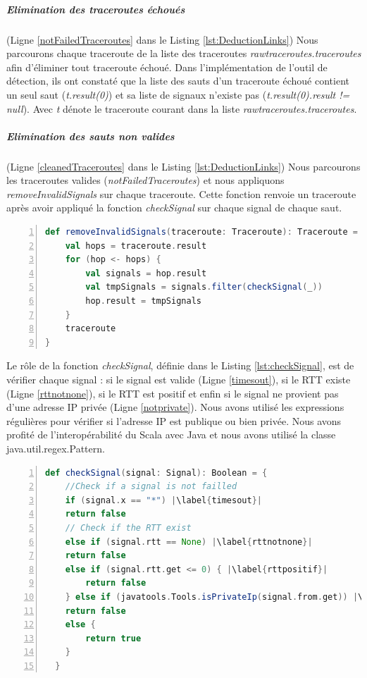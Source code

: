\subparagraph{Elimination des traceroutes échoués} (Ligne \ref{notFailedTraceroutes} dans le Listing \ref{lst:DeductionLinks}) Nous parcourons chaque traceroute de la liste des traceroutes \textit{rawtraceroutes.traceroutes} afin d'éliminer tout traceroute échoué. Dans l'implémentation de l'outil de détection, ils ont constaté que la liste des sauts d'un traceroute échoué contient un seul saut (\textit{t.result(0)}) et sa liste de signaux n'existe pas (\textit{t.result(0).result != null}). Avec \textit{t} dénote le traceroute courant dans la liste \textit{rawtraceroutes.traceroutes}. 


\subparagraph{Elimination des sauts non valides} (Ligne \ref{cleanedTraceroutes} dans le Listing \ref{lst:DeductionLinks}) Nous parcourons les traceroutes valides (\textit{notFailedTraceroutes}) et nous appliquons  \textit{removeInvalidSignals} sur chaque traceroute. Cette fonction renvoie un traceroute après avoir appliqué la fonction \textit{checkSignal} sur chaque signal de chaque saut. 

\begin{lstlisting}[language=scala,firstnumber=1, caption={Définition de la méthode removeInvalidSignals},label={lst:removeInvalidSignals}, basicstyle = \footnotesize,escapechar=|,numbers=left,
stepnumber=1]
  def removeInvalidSignals(traceroute: Traceroute): Traceroute = {
	val hops = traceroute.result
	for (hop <- hops) {
		val signals = hop.result
		val tmpSignals = signals.filter(checkSignal(_))
		hop.result = tmpSignals
	}
	traceroute
}
\end{lstlisting}

Le rôle de la fonction \textit{checkSignal}, définie dans le Listing \ref{lst:checkSignal},  est de vérifier chaque signal : si le signal est valide (Ligne \ref{timesout}), si le RTT existe (Ligne \ref{rttnotnone}), si le RTT est positif \label{rttpositif} et enfin si le signal ne provient pas d'une adresse IP privée (Ligne \ref{notprivate}). Nous avons utilisé les expressions régulières pour vérifier si l'adresse IP est publique ou bien privée. Nous avons profité de l'interopérabilité du Scala avec Java et nous avons  utilisé la classe java.util.regex.Pattern.

\begin{lstlisting}[language=scala,firstnumber=1, caption={Définition de la méthode checkSignal},label={lst:checkSignal}, basicstyle = \footnotesize,escapechar=|,numbers=left,
stepnumber=1]
  def checkSignal(signal: Signal): Boolean = {
	//Check if a signal is not failled
	if (signal.x == "*") |\label{timesout}|
	return false
	// Check if the RTT exist
	else if (signal.rtt == None) |\label{rttnotnone}|
	return false
	else if (signal.rtt.get <= 0) { |\label{rttpositif}|
		return false
	} else if (javatools.Tools.isPrivateIp(signal.from.get)) |\label{notprivate}|
	return false
	else {
		return true
	}
  }
\end{lstlisting}

